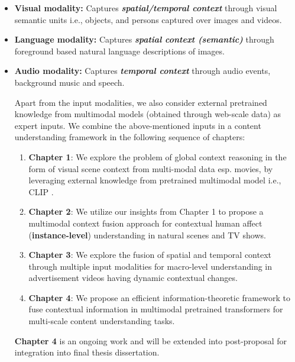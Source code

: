 \begin{itemize}
    \item  \textbf{Visual modality:} Captures \textbf{\textit{spatial/temporal context}} through visual semantic units i.e., objects, and persons captured over images and videos.
    \item  \textbf{Language modality:} Captures \textbf{\textit{spatial context (semantic)}} through foreground based natural language descriptions of images.
    \item  \textbf{Audio modality:} Captures \textbf{\textit{temporal context}} through audio events, background music and speech.

Apart from the input modalities, we also consider external pretrained knowledge from multimodal models (obtained through web-scale data) as expert inputs.
We combine the above-mentioned inputs in a content understanding framework in the following sequence of chapters:

\begin{enumerate}
    \item \textbf{Chapter 1}: We explore the problem of global context reasoning in the form of visual scene context from multi-modal data esp. movies, by leveraging external knowledge from pretrained multimodal model i.e., CLIP \cite{Radford2021LearningTV}.
    \item \textbf{Chapter 2}: We utilize our insights from Chapter 1 to propose a multimodal context fusion approach for contextual human affect (\textbf{instance-level}) understanding in natural scenes and TV shows.
    \item \textbf{Chapter 3}: We explore the fusion of spatial and temporal context through multiple input modalities for macro-level understanding in advertisement videos having dynamic contextual changes. 
    \item \textbf{Chapter 4}: We propose an efficient information-theoretic framework to fuse contextual information in multimodal pretrained transformers for multi-scale content understanding tasks.
\end{enumerate}

\textbf{Chapter 4} is an ongoing work and will be extended into post-proposal for integration into final thesis dissertation.

\end{itemize}

